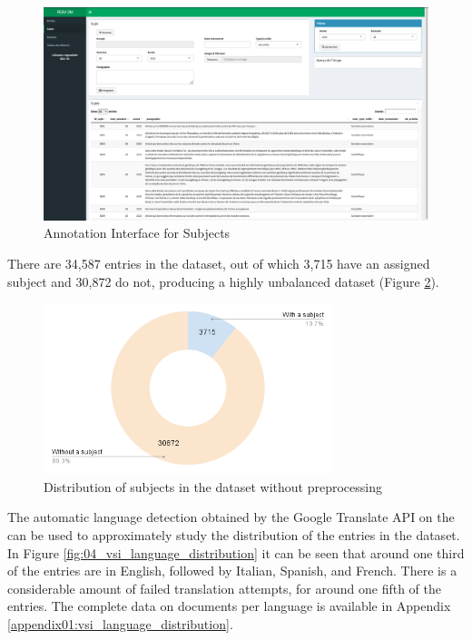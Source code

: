 \begin{landscape}
    \begin{figure}[ht]
        \centering
        \includegraphics[width=1.20\textwidth]{Figures/04/PESV_interface_2.png}
        \caption{\VSI{} Annotation Interface for Subjects}
        \label{fig:04_pesv_interface_2}
    \end{figure}
\end{landscape}


\label{vsi_data_statistics}

There are 34,587 entries in the dataset, out of which 3,715 have an assigned subject and 30,872 do not, producing a highly unbalanced dataset (Figure \ref{fig:04_naive_positives_and_negatives}). 

\begin{figure}
    \centering
    \includegraphics[width=0.75\textwidth]{Figures/04/naive_positives_and_negatives_chart.png}
    \caption{Distribution of subjects in the \VSI{} dataset without preprocessing}
    \label{fig:04_naive_positives_and_negatives}
\end{figure}

The automatic language detection obtained by the Google Translate API on the \trafilaturaTitle{} can be used to approximately study the distribution of the entries in the dataset. In Figure \ref{fig:04_vsi_language_distribution} it can be seen that around one third of the entries are in English, followed by Italian, Spanish, and French. There is a considerable amount of failed translation attempts, for around one fifth of the entries. The complete data on documents per language is available in Appendix \ref{appendix01:vsi_language_distribution}.
 
